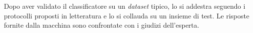 Dopo aver validato il classificatore su un \textit{dataset} tipico,
lo si addestra seguendo i protocolli proposti in letteratura
e lo si collauda su un insieme di test.
Le risposte fornite dalla macchina sono confrontate con i giudizi dell'esperta.